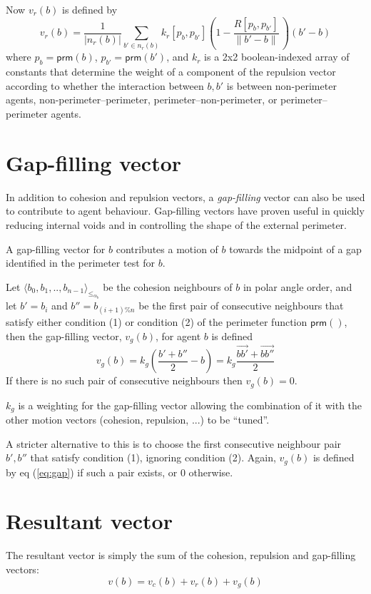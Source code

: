 \documentclass[12pt,a4paper]{article}
\renewcommand{\vec}[1]{\overrightarrow{#1}}
\newcommand{\pangle}{\mathit{\alpha}}
\newcommand{\leqaz}[3]{#2 \leq_{\pangle_#1} #3}
\newcommand{\angleordered}[2]{\langle #2 \rangle_{\leqaz{#1}{}{}}}
\newcommand{\prm}{\mathsf{prm}}
\newcommand{\kr}{\mathit{k_r}}
\newcommand{\rb}{\mathit{R}}
\begin{document}
Now $v_r(b)$ is defined by
\begin{equation}\label{eq:rep2}
	v_r(b) = \frac{1}{|n_r(b)|}\sum_{b' \in n_r(b)} \kr[p_b,p_{b'}] \left(1 - \frac{\rb[p_b,p_{b'}]}{\|b'-b\|} \, \right) (b'-b)
\end{equation}
where $p_b = \prm(b)$, $p_{b'} = \prm(b')$, and $\kr$ is a 2x2 boolean-indexed
array of constants that determine the weight of a component of the repulsion
vector according to whether the interaction between $b,b'$ is between
non-perimeter agents, non-perimeter--perimeter, perimeter--non-perimeter, or
perimeter--perimeter agents.

\section{Gap-filling vector}
In addition to cohesion and repulsion vectors, a \emph{gap-filling} vector can
also be used to contribute to agent behaviour. Gap-filling vectors have proven
useful in quickly reducing internal voids and in controlling the shape of the
external perimeter.

A gap-filling vector for $b$ contributes a motion of $b$ towards the midpoint
of a gap identified in the perimeter test for $b$.

Let $\angleordered{b}{b_0, b_1, .., b_{n-1}}$ be the cohesion neighbours of $b$
in polar angle order, and let $b' = b_i$  and $b'' = b_{(i+1)\%n}$ be the first
pair of consecutive neighbours that satisfy either condition (1) or condition
(2) of the perimeter function $\prm()$, then the gap-filling vector, $v_g(b)$,
for agent $b$ is defined
\begin{equation}\label{eq:gap}
v_g(b) = k_g \left (\frac{b' + b''}{2} - b \right) = k_g \frac{\vec{bb'} + \vec{bb''}}{2} 
\end{equation}
If there is no such pair of consecutive neighbours then $v_g(b) = 0$.

$k_g$ is a weighting for the gap-filling vector allowing the combination of it
with the other motion vectors (cohesion, repulsion, ...) to be ``tuned''.

A stricter alternative to this is to choose the first consecutive neighbour
pair $b',b''$ that satisfy condition (1), ignoring condition (2).  Again,
$v_g(b)$ is defined by eq (\ref{eq:gap}) if such a pair exists, or 0 otherwise.

\section{Resultant vector}
The resultant vector is simply the sum of the cohesion, repulsion and
gap-filling vectors:
\begin{equation}\label{eq:res}
	v(b) = v_c(b) + v_r(b) + v_g(b) 
\end{equation}
\end{document}
